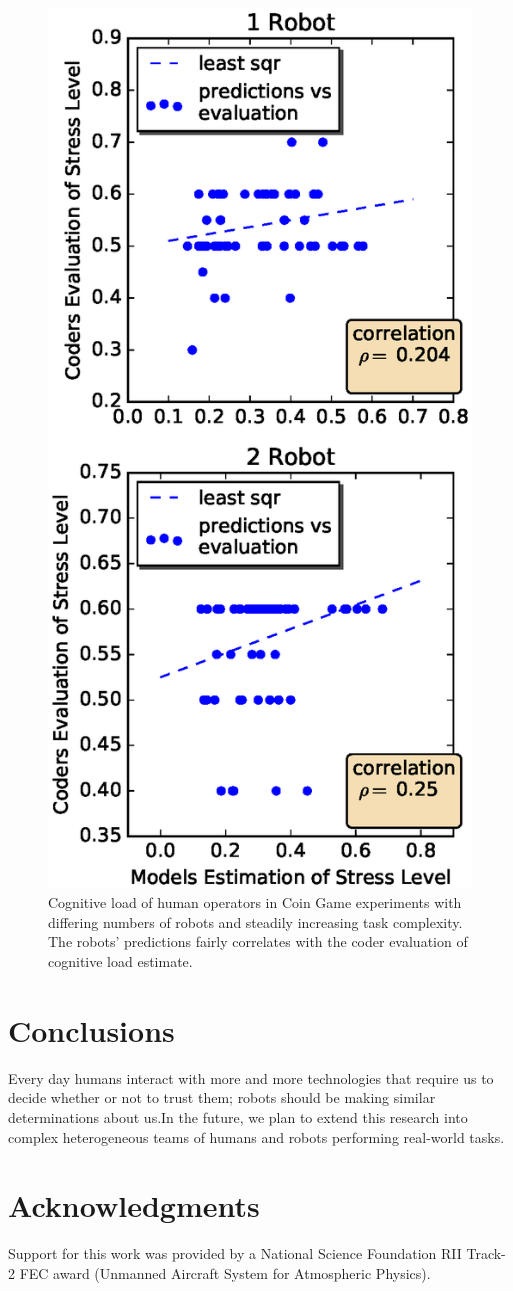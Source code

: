 \documentclass{sig-alternate}
\begin{document}
\begin{figure}  
\centering
\includegraphics[width=.5\textwidth]{coder_eval_1_2.eps}
\caption{Cognitive load of human operators in Coin Game experiments with differing numbers of robots and steadily increasing task complexity. The robots' predictions fairly correlates with the coder evaluation of cognitive load estimate.}
\label{fig:coder_eval_1_2}
\end{figure}


\section{Conclusions}

Every day humans interact with more and more technologies that require us to decide whether or not to trust them; robots
should be making similar determinations about us.In the future, we plan to extend this research into complex
heterogeneous teams of humans and robots performing real-world tasks.

\section{Acknowledgments}
Support for this work was provided by a National Science Foundation
RII Track-2 FEC award (Unmanned Aircraft System for Atmospheric
Physics).



%

\end{document}
